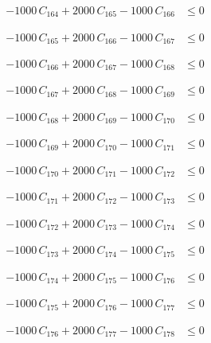 \documentclass[a4paper,11pt]{article}
\begin{document}
\begin{align}
-1000\,C_{164} + 2000\,C_{165} - 1000\,C_{166} &\leq 0 \nonumber
\end{align}

\begin{align}
-1000\,C_{165} + 2000\,C_{166} - 1000\,C_{167} &\leq 0 \nonumber
\end{align}

\begin{align}
-1000\,C_{166} + 2000\,C_{167} - 1000\,C_{168} &\leq 0 \nonumber
\end{align}

\begin{align}
-1000\,C_{167} + 2000\,C_{168} - 1000\,C_{169} &\leq 0 \nonumber
\end{align}

\begin{align}
-1000\,C_{168} + 2000\,C_{169} - 1000\,C_{170} &\leq 0 \nonumber
\end{align}

\begin{align}
-1000\,C_{169} + 2000\,C_{170} - 1000\,C_{171} &\leq 0 \nonumber
\end{align}

\begin{align}
-1000\,C_{170} + 2000\,C_{171} - 1000\,C_{172} &\leq 0 \nonumber
\end{align}

\begin{align}
-1000\,C_{171} + 2000\,C_{172} - 1000\,C_{173} &\leq 0 \nonumber
\end{align}

\begin{align}
-1000\,C_{172} + 2000\,C_{173} - 1000\,C_{174} &\leq 0 \nonumber
\end{align}

\begin{align}
-1000\,C_{173} + 2000\,C_{174} - 1000\,C_{175} &\leq 0 \nonumber
\end{align}

\begin{align}
-1000\,C_{174} + 2000\,C_{175} - 1000\,C_{176} &\leq 0 \nonumber
\end{align}

\begin{align}
-1000\,C_{175} + 2000\,C_{176} - 1000\,C_{177} &\leq 0 \nonumber
\end{align}

\begin{align}
-1000\,C_{176} + 2000\,C_{177} - 1000\,C_{178} &\leq 0 \nonumber
\end{align}
\end{document}
